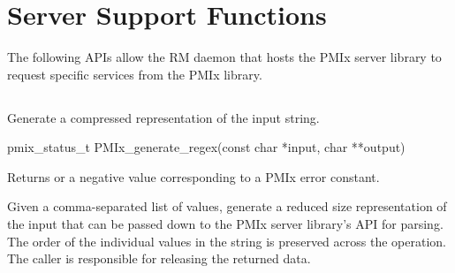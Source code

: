 %

%

%

\section{Server Support Functions}

The following \acp{API} allow the \ac{RM} daemon that hosts the \ac{PMIx} server library to request specific services from the \ac{PMIx} library.

\subsection{}

\summary

Generate a compressed representation of the input string.

\format

\cspecificstart
\begin{codepar}
pmix_status_t
PMIx_generate_regex(const char *input, char **output)
\end{codepar}
\cspecificend

\begin{arglist}
\end{arglist}

Returns  or a negative value corresponding to a PMIx error constant.

\descr

Given a comma-separated list of  values, generate a reduced size representation of the input that can be passed down to the \ac{PMIx} server library's  \ac{API} for parsing. The order of the individual values in the  string is preserved across the operation. The caller is responsible for releasing the returned data.


